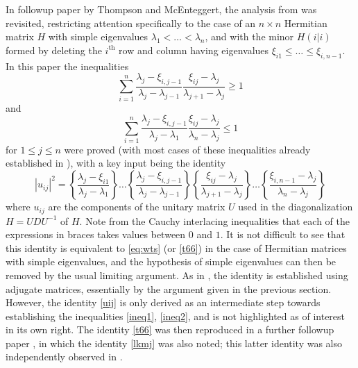 \documentclass[12pt]{amsart}
\begin{document}
In followup paper \cite{Thompson:1968} by Thompson and McEnteggert, the analysis from \cite{Thompson:1966} was revisited, restricting attention specifically to the case of an $n \times n$ Hermitian matrix $H$ with simple eigenvalues $\lambda_1 < \dots < \lambda_n$, and with the minor $H(i|i)$ formed by deleting the $i^{\mathrm{th}}$ row and column having eigenvalues $\xi_{i1} \leq \dots \leq \xi_{i,n-1}$.  In this paper the inequalities
\begin{equation}\label{ineq1}
 \sum_{i=1}^n \frac{\lambda_j - \xi_{i,j-1}}{\lambda_j - \lambda_{j-1}} \frac{\xi_{ij} - \lambda_j}{\lambda_{j+1}-\lambda_j} \geq 1
\end{equation}
and
\begin{equation}\label{ineq2}
 \sum_{i=1}^n \frac{\lambda_j - \xi_{i,j-1}}{\lambda_j - \lambda_1} \frac{\xi_{ij}-\lambda_j}{\lambda_n-\lambda_j} \leq 1
\end{equation}
for $1 \leq j \leq n$ were proved (with most cases of these inequalities already established in \cite{Thompson:1966}), with a key input being the identity
\begin{equation}\label{uij}
|u_{ij}|^2 = \left\{ \frac{\lambda_j - \xi_{i1}}{\lambda_j - \lambda_1} \right\} \dots \left\{ \frac{\lambda_j - \xi_{i,j-1}}{\lambda_j - \lambda_{j-1}} \right\} \left\{ \frac{\xi_{ij}-\lambda_j}{\lambda_{j+1} - \lambda_j} \right\} \dots \left\{ \frac{\xi_{i,n-1}-\lambda_j}{\lambda_{n} - \lambda_j} \right\}
\end{equation}
where $u_{ij}$ are the components of the unitary matrix $U$ used in the diagonalization $H = UDU^{-1}$ of $H$.  Note from the Cauchy interlacing inequalities that each of the expressions in braces takes values between $0$ and $1$. It is not difficult to see that this identity is equivalent to \eqref{eq:wts} (or \eqref{t66}) in the case of Hermitian matrices with simple eigenvalues, and the hypothesis of simple eigenvalues can then be removed by the usual limiting argument.  As in \cite{Thompson:1966}, the identity is established using adjugate matrices, essentially by the argument given in the previous section. However, the identity \eqref{uij} is only derived as an intermediate step towards establishing the inequalities \eqref{ineq1}, \eqref{ineq2}, and is not highlighted as of interest in its own right.  The identity \eqref{t66} was then reproduced in a further followup paper \cite{thompson-iv}, in which the identity \eqref{lkmj} was also noted; this latter identity was also independently observed in \cite{deutsch}.
\end{document}
